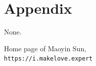 \documentclass{book}
\begin{document}
\chapter*{Appendix}
None.

\listoffigures

\printindex

\begin{thebibliography}{9}
Home page of Maoyin Sun,
\\\texttt{https://i.makelove.expert}
\end{thebibliography}
\end{document}
